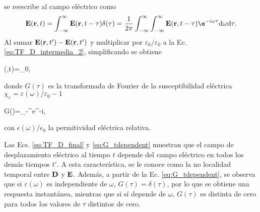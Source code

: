 se reescribe al campo eléctrico como
\begin{equation}
	\vb{E}(\vb{r},t)=\int_{-\infty}^{\infty}\vb{E}(\vb{r},t-\tau)\delta(\tau)=\frac{1}{2\pi}\int_{-\infty}^{\infty}\int_{-\infty}^{\infty}\vb{E}(\vb{r},t-\tau)\e^{-i\omega\tau}\text{d}\omega\text{d}\tau.
\end{equation}
%
Al sumar $\vb{E}(\vb{r},t')-\vb{E}(\vb{r},t')$ y multiplicar por $\varepsilon_0/\varepsilon_0$ a la Ec. \eqref{eq:TF_D_intermedia_2}, simplificando se obtiene
%
\begin{tcolorbox}
		(,t)=\varepsilon_0,\label{eq:TF_D_final} 
\end{tcolorbox}
%
\noindent donde $G(\tau)$ es la transformada de Fourier de la susceptibilidad eléctrica $\chi_e=\varepsilon(\omega)/\varepsilon_0-1$ \cite{jacksonClassicalElectrodynamics2021a}
%
\begin{tcolorbox}
	G(\tau)=\int_{-\infty}^{\infty}e^{-i\omega\tau}\omega,
	\label{eq:G_tdependent} 
\end{tcolorbox}
%
\noindent con $\epsilon(\omega)/\epsilon_0$ la permitividad eléctrica relativa.

\noindent Las Ecs. \eqref{eq:TF_D_final} y \eqref{eq:G_tdependent} muestran que el campo de desplazamiento eléctrico al tiempo $t$ depende del campo eléctrico en todos los demás tiempos $t'$. A esta característica, se le conoce como la no localidad temporal entre $\vb{D}$ y $\vb{E}$. Además, a partir de la Ec. \eqref{eq:G_tdependent}, se observa que si $\varepsilon(\omega)$ es independiente de $\omega$, $G(\tau)=\delta(\tau)$, por lo que se obtiene una respuesta instantánea, mientras que si sí depende de $\omega$, $G(\tau)$ es distinta de cero para todos los valores de $\tau$ distintos de cero.

